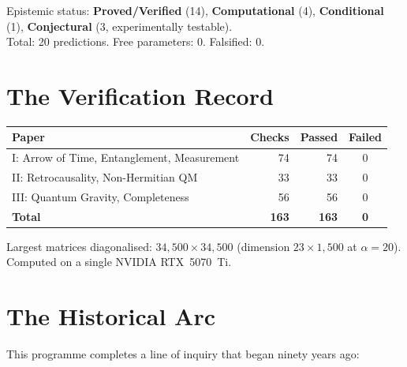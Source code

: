 \documentclass[12pt,a4paper]{article}
\theoremstyle{definition}\newtheorem{definition}[theorem]{Definition}
\theoremstyle{remark}\newtheorem{remark}[theorem]{Remark}
\begin{document}
\noindent
Epistemic status: \textcolor{proved}{\textbf{Proved/Verified}} (14),
\textcolor{computational}{\textbf{Computational}} (4),
\textcolor{conditional}{\textbf{Conditional}} (1),
\textcolor{conjectural}{\textbf{Conjectural}} (3, experimentally testable).
\\[6pt]
Total: 20 predictions. Free parameters: 0. Falsified: 0.

\section{The Verification Record}
\label{sec:verification}

\begin{center}
\begin{tabular}{lrrc}
\toprule
\textbf{Paper} & \textbf{Checks} & \textbf{Passed} & \textbf{Failed} \\
\midrule
I: Arrow of Time, Entanglement, Measurement & 74 & 74 & 0 \\
II: Retrocausality, Non-Hermitian QM & 33 & 33 & 0 \\
III: Quantum Gravity, Completeness & 56 & 56 & 0 \\
\midrule
\textbf{Total} & \textbf{163} & \textbf{163} & \textbf{0} \\
\bottomrule
\end{tabular}
\end{center}

Largest matrices diagonalised: $34{,}500 \times 34{,}500$ (dimension
$23 \times 1{,}500$ at $\alpha = 20$). Computed on a single NVIDIA RTX~5070~Ti.

\section{The Historical Arc}
\label{sec:history}

This programme completes a line of inquiry that began ninety years ago:
\end{document}
